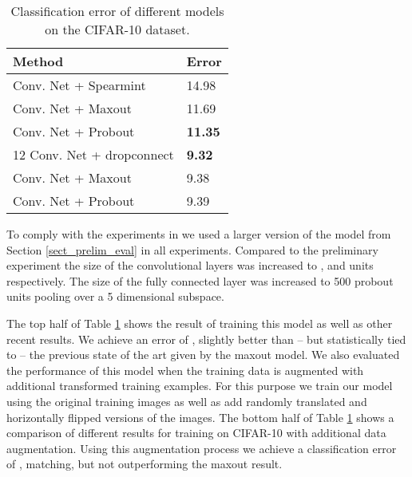 \documentclass{article} \pdfoutput=1
\begin{document}
\begin{table}[t]
\vskip 0.15in
\caption{Classification error of different models on the
  CIFAR-10 dataset.}
\begin{center}
\begin{small}
\begin{sc}
\begin{tabular}{l|l}
Method  & Error \\
\hline
Conv. Net + Spearmint \cite{Snoek2012} & 14.98  \\
Conv. Net + Maxout    \cite{Goodfellow2013}  & 11.69  \\
Conv. Net + Probout   & \textbf{11.35 } \\
\hline
12  Conv. Net + dropconnect \cite{WanLi2013} & \textbf{9.32 } \\
Conv. Net + Maxout \cite{Goodfellow2013} &
                                                                    9.38  \\
Conv. Net + Probout & 9.39  \\
\hline
\end{tabular}
\end{sc}
\end{small}
\end{center}
\vskip -0.1in
\label{cifar10_results}
\end{table}
To comply with the experiments in \cite{Goodfellow2013} we used a
larger version of the model from Section \ref{sect_prelim_eval} in all
experiments. Compared to the preliminary experiment the size
of the convolutional layers was increased to ,  and  units
respectively. The size of the fully connected layer was increased to
500 probout units pooling over a 5 dimensional subspace.

The top half of Table \ref{cifar10_results} shows the result of
training this model as well as other recent results. We achieve an
error of , slightly better than -- but statistically tied to --
the previous state of the art given by the maxout model. We also evaluated the performance of this
model when the training data is augmented with additional
transformed training examples. For this purpose we train our model
using the original training images as well as add randomly translated
and horizontally flipped versions of the images. The bottom half of
Table \ref{cifar10_results} shows a comparison of different results
for training on CIFAR-10 with additional data augmentation. Using this
augmentation process we achieve a classification error of ,
matching, but not outperforming the maxout result.
\end{document}
